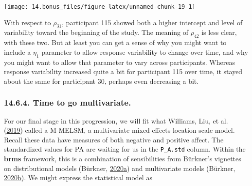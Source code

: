 \documentclass[]{article}
\begin{document}
\begin{center}\texttt{[image: 14.bonus\_files/figure-latex/unnamed-chunk-19-1]} \end{center}

With respect to \(\rho_{31}\), participant 115 showed both a higher
intercept and level of variability toward the beginning of the study.
The meaning of \(\rho_{42}\) is less clear, with these two. But at least
you can get a sense of why you might want to include a \(\eta_1\)
parameter to allow response variability to change over time, and why you
might want to allow that parameter to vary across participants. Whereas
response variability increased quite a bit for participant 115 over
time, it stayed about the same for participant 30, perhaps even
decreasing a bit.

\hypertarget{time-to-go-multivariate.}{%
\subsubsection{14.6.4. Time to go
multivariate.}\label{time-to-go-multivariate.}}

For our final stage in this progression, we will fit what Williams, Liu,
et al.
(\protect\hyperlink{ref-williamsBayesianMultivariateMixedeffects2019a}{2019})
called a M-MELSM, a multivariate mixed-effects location scale model.
Recall these data have measures of both negative and positive affect.
The standardized values for PA are waiting for us in the
\texttt{P\_A.std} column. Within the \textbf{brms} framework, this is a
combination of sensibilities from Bürkner's vignettes on distributional
models (Bürkner,
\protect\hyperlink{ref-Buxfcrkner2020Distributional}{2020}\protect\hyperlink{ref-Buxfcrkner2020Distributional}{a})
and multivariate models (Bürkner,
\protect\hyperlink{ref-Buxfcrkner2020Multivariate}{2020}\protect\hyperlink{ref-Buxfcrkner2020Multivariate}{b}).
We might express the statistical model as
\end{document}
